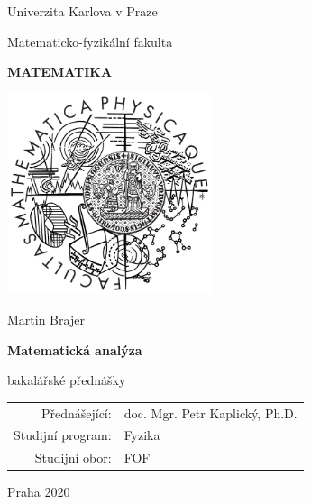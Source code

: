 \documentclass[12pt,a4paper]{report}
\begin{document}


\pagestyle{empty}
\begin{center}

\large

Univerzita Karlova v Praze

\medskip

Matematicko-fyzikální fakulta

\vfill

{\bf\Large MATEMATIKA}

\vfill

\centerline{\mbox{\includegraphics[width=60mm]{img/LogoMFF.png}}}

\vfill
\vspace{5mm}

{\LARGE Martin Brajer}

\vspace{15mm}

{\LARGE\bfseries Matematická analýza}

\vfill

bakalářské přednášky

\vfill

\begin{tabular}{rl}

Přednášející: & doc. Mgr. Petr Kaplický, Ph.D. \\
\noalign{\vspace{2mm}}
Studijní program: & Fyzika \\
\noalign{\vspace{2mm}}
Studijní obor: & FOF \\
\end{tabular}

\vfill

Praha 2020

\end{center}
\end{document}
